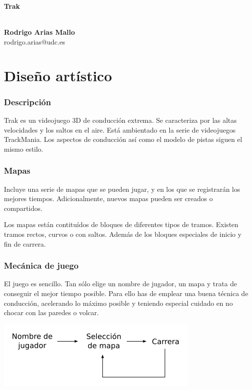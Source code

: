 \documentclass[11pt,a4paper,hidelinks]{article}
\begin{document}
\begin{center}
\begin{huge}
\textbf{Trak}
\end{huge}
\\[10pt]
\textbf{Rodrigo Arias Mallo}\\
rodrigo.arias@udc.es
\end{center}

\part{Diseño artístico}
\section{Descripción}
Trak es un videojuego 3D de conducción extrema. Se caracteriza por las altas 
velocidades y los saltos en el aire. Está ambientado en la serie de videojuegos 
TrackMania. Los aspectos de conducción así como el modelo de pistas siguen el 
mismo estilo.

\section{Mapas}
Incluye una serie de mapas que se pueden jugar, y en los que se registrarán los 
mejores tiempos. Adicionalmente, nuevos mapas pueden ser creados o compartidos.

Los mapas están contituídos de bloques de diferentes tipos de tramos. Existen 
tramos rectos, curvos o con saltos. Además de los bloques especiales de inicio y 
fin de carrera.

\section{Mecánica de juego}
El juego es sencillo. Tan sólo elige un nombre de jugador, un mapa y trata de 
conseguir el mejor tiempo posible. Para ello has de emplear una buena técnica de 
conducción, acelerando lo máximo posible y teniendo especial cuidado en no 
chocar con las paredes o volcar.

\begin{center}
\includegraphics{fases}
\end{center}
\end{document}
